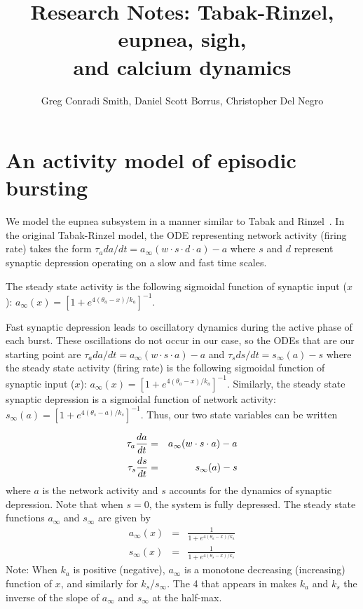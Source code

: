 \documentclass[12pt]{article}
\title{Research Notes: Tabak-Rinzel, eupnea, sigh,\\  and calcium dynamics}
\author{Greg Conradi Smith, Daniel Scott Borrus, Christopher Del Negro }
\def\w{w}
\def\taus{\tau_s}
\def\thetaa{\theta_a}
\def\ka{k_a}
\def\thetas{\theta_s}
\def\ks{k_s}
\def\ainf{a_\infty}
\def\sinf{s_\infty}
\begin{document}
\maketitle

\section*{An activity model of episodic bursting}

We model the eupnea subsystem in a manner similar to Tabak and Rinzel~\citeyearpar{TabakRinzel05}.  In the original Tabak-Rinzel model, the ODE representing network activity (firing rate) takes the form $\tau_a da/dt = \ainf (\w \cdot s \cdot d \cdot a) - a$ where $s$ and $d$ represent synaptic depression operating on a slow and fast time scales. 

The steady state activity is the following sigmoidal function of synaptic input ($x$): $\ainf(x) =  [1+e^{4(\thetaa-x)/\ka}]^{-1}$. 


Fast synaptic depression leads to oscillatory dynamics during the active phase of each burst.  These oscillations do not occur in our case, so 
the ODEs that are our starting point are
$\tau_a da/dt = \ainf (\w \cdot s \cdot a) - a$ and $
\taus ds/dt = \sinf (a) - s$ where the steady state activity (firing rate) is the following sigmoidal function of synaptic input ($x$): $\ainf(x) =  [1+e^{4(\thetaa-x)/\ka}]^{-1}$.  Similarly, the steady state synaptic depression is a sigmoidal function of network activity: $\sinf(a) =  [1+e^{4(\thetas-a)/\ks}]^{-1}$. Thus, our two state variables can be written 

\begin{eqnarray}
\tau_a \ddt{a} &=& \ainf (\w \cdot s \cdot a) - a\label{ODEa} \\
\taus \ddt{s} &=& \sinf (a) - s  \label{ODEs} 
\end{eqnarray}
where $a$ is the network activity and $s$ accounts for the dynamics of synaptic depression. Note that when $s=0$, the system is fully depressed.
The steady state functions $\ainf$ and $\sinf$ are given by 
\begin{eqnarray}
\ainf(x) &=& \frac{1}{1+e^{4(\thetaa-x)/\ka}}  \label{SQUASHA} \\
\sinf(x) &=& \frac{1}{1+e^{4(\thetas-x)/\ks}}  \label{SQUASHS} 
\end{eqnarray}
Note: When $\ka$ is positive (negative), $\ainf$ is a monotone decreasing (increasing) function of $x$, and similarly for $\ks$/$\sinf$.   The 4 that appears  in  makes $\ka$ and $\ks$ the inverse of the slope of $\ainf$ and $\sinf$ at the half-max.  
\end{document}
